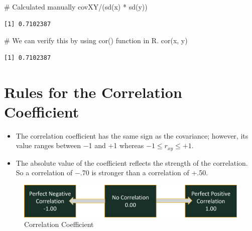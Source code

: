 \documentclass[
  letterpaper,
  DIV=11,
  numbers=noendperiod]{scrreprt}
\newenvironment{Shaded}{\begin{snugshade}}{\end{snugshade}}
\newcommand{\CommentTok}[1]{\textcolor[rgb]{0.37,0.37,0.37}{#1}}
\newcommand{\FunctionTok}[1]{\textcolor[rgb]{0.28,0.35,0.67}{#1}}
\newcommand{\NormalTok}[1]{\textcolor[rgb]{0.00,0.23,0.31}{#1}}
\newcommand{\SpecialCharTok}[1]{\textcolor[rgb]{0.37,0.37,0.37}{#1}}
\providecommand{\tightlist}{%
  \setlength{\itemsep}{0pt}\setlength{\parskip}{0pt}}\usepackage{longtable,booktabs,array}
\begin{document}
\begin{Shaded}
\begin{Highlighting}[]
\CommentTok{\# Calculated manually}
\NormalTok{covXY}\SpecialCharTok{/}\NormalTok{(}\FunctionTok{sd}\NormalTok{(x) }\SpecialCharTok{*} \FunctionTok{sd}\NormalTok{(y))}
\end{Highlighting}
\end{Shaded}

\begin{verbatim}
[1] 0.7102387
\end{verbatim}

\begin{Shaded}
\begin{Highlighting}[]
\CommentTok{\# We can verify this by using cor() function in R.}
\FunctionTok{cor}\NormalTok{(x, y)}
\end{Highlighting}
\end{Shaded}

\begin{verbatim}
[1] 0.7102387
\end{verbatim}

\section{Rules for the Correlation
Coefficient}\label{rules-for-the-correlation-coefficient}

\begin{itemize}
\tightlist
\item
  The correlation coefficient has the same sign as the covariance;
  however, its value ranges between −1 and +1 whereas
  \(-1 \le r_{xy} \le +1\).
\item
  The absolute value of the coefficient reflects the strength of the
  correlation. So a correlation of −.70 is stronger than a correlation
  of +.50.
\end{itemize}

\begin{figure}[H]

{\centering \includegraphics{Pictures/Ch8/Correlation.png}

}

\caption{Correlation Coefficient}

\end{figure}%
\end{document}
